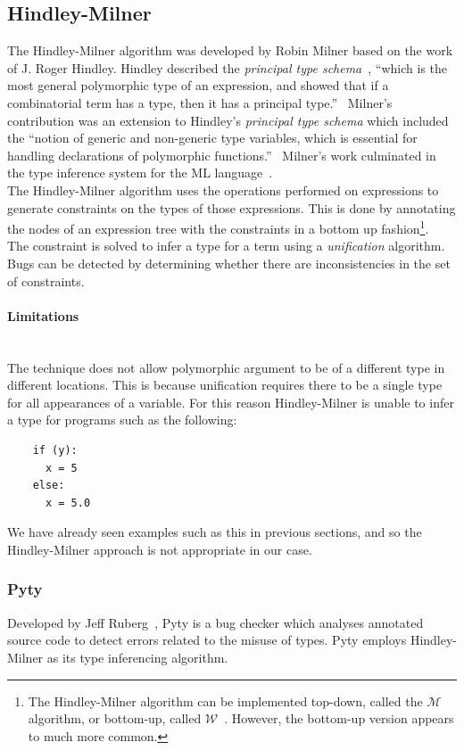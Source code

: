 \documentclass[12pt, titlepage]{article}
\begin{document}
\subsection{Hindley-Milner}
The Hindley-Milner algorithm was developed by Robin Milner based on the work of J. Roger Hindley. Hindley described the \textit{principal
type schema}~\cite{hindley69}, ``which is the most general polymorphic type of an expression, and showed that if a combinatorial term has a type, then it has a principal type.''~\cite{cardelli87} Milner's contribution was an extension to Hindley's \textit{principal type schema} which included the ``notion of generic and non-generic type variables, which is essential for handling declarations of polymorphic functions.''~\cite{cardelli87} Milner's work culminated in the type inference system for the ML language~\cite{milner84}. \\
The Hindley-Milner algorithm uses the operations performed on expressions to generate constraints on the types of those expressions. This is done by annotating the nodes of an expression tree with the constraints in a bottom up fashion\footnote{The Hindley-Milner algorithm can be implemented top-down, called the $\mathcal{M}$ algorithm, or bottom-up, called $\mathcal{W}$~\cite{heeren02}. However, the bottom-up version appears to much more common.}. \\ The constraint is solved to infer a type for a term using a \textit{unification} algorithm.
Bugs can be detected by determining whether there are inconsistencies in the set of constraints.

\paragraph{Limitations}\mbox{}\\
The technique does not allow polymorphic argument to be of a different type in different locations. This is because unification requires there to be a single type for all appearances of a variable. For this reason Hindley-Milner is unable to infer a type for programs such as the following:
\begin{lstlisting}
	if (y):	
	  x = 5     
	else:
	  x = 5.0   
\end{lstlisting}
We have already seen examples such as this in previous sections, and so the Hindley-Milner approach is not appropriate in our case.

\subsubsection{Pyty}
Developed by Jeff Ruberg~\cite{pyty}, Pyty is a bug checker which analyses annotated source code to detect errors related to the misuse of types. Pyty employs Hindley-Milner as its type inferencing algorithm.
\end{document}
